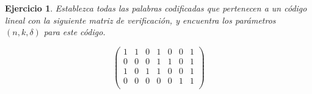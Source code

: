 \documentclass{beamer}
\theoremstyle{plain}
\theoremstyle{example}
\newtheorem{ejercicio} [Ejercicio]{Ejercicio}
\theoremstyle{example}
\begin{document}

\begin{frame}  \small \begin{ejercicio} 

Establezca todas las palabras codificadas que pertenecen a un código lineal con la siguiente matriz de verificación, y encuentra los parámetros $(n,k,\delta)$ para este código.

\[
        \left( \begin{array}{ccccccc}
                      1 &   1   &   0  &    1 &   0  &   0    &1\\  
					  0 &   0   &   0  &    1 &   1  &   0	  &1\\ 
					  1 &   0   &   1  &    1 &   0  &   0	  &1\\
					  0 &   0   &   0  &    0 &   0  &   1	  &1\\
           			\end{array}
    		\right) 	    		
\]
\end{ejercicio}  \end{frame} 
\end{document}

